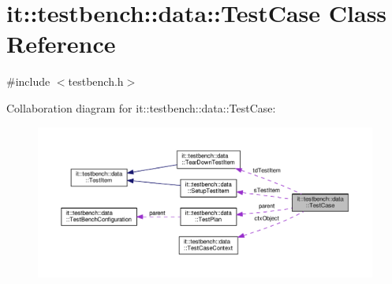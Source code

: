 \hypertarget{classit_1_1testbench_1_1data_1_1TestCase}{\section{it\-:\-:testbench\-:\-:data\-:\-:Test\-Case Class Reference}
\label{de/d0a/classit_1_1testbench_1_1data_1_1TestCase}
}


{\ttfamily \#include $<$testbench.\-h$>$}



Collaboration diagram for it\-:\-:testbench\-:\-:data\-:\-:Test\-Case\-:
\nopagebreak
\begin{figure}[H]
\begin{center}
\leavevmode
\includegraphics[width=350pt]{d9/d4c/classit_1_1testbench_1_1data_1_1TestCase__coll__graph}
\end{center}
\end{figure}
